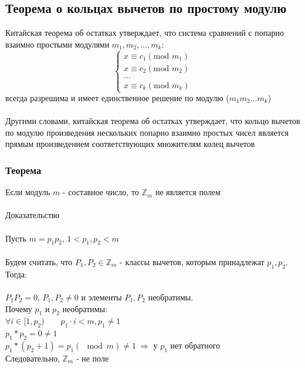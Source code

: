 \documentclass[12pt]{article}
\begin{document}
\subsection{Теорема о кольцах вычетов по простому модулю}

Китайская теорема об остатках утверждает, что система сравнений с попарно взаимно простыми модулями
$m_1, m_2, \dots, m_k$:\\
\begin{equation*}
    \begin{cases}
        x \equiv c_1  (\text{mod } m_1) \\
        x \equiv c_2 (\text{mod } m_2)  \\
        \dots                           \\
        x \equiv c_k (\text{mod } m_k)
    \end{cases}
\end{equation*}
всегда разрешима и имеет единственное решение по модулю ($m_1m_2\dots m_k$)\\
\\
Другими словами, китайская теорема об остатках утверждает, что кольцо вычетов по модулю произведения нескольких попарно взаимно простых чисел является прямым произведением соответствующих множителям колец вычетов

\subsubsection{Теорема}
Если модуль $m$ - составное число, то $\mathbb{Z}_m$ не является полем\\
\\
Доказательство\\
\\
Пусть \quad $m = p_1p_2$, \qquad $1 < p_1, p_2 < m$\\
\\
Будем считать, что $P_1, P_2 \in \mathbb{Z}_m$ - классы вычетов, которым принадлежат $p_1, p_2$. Тогда:\\
\\
\quad $P_1P_2 = 0$, \quad $P_1, P_2 \ne 0$ \quad и элементы $P_1, P_2$ необратимы.\\
Почему $p_1$ и $p_2$ необратимы:\\
$\forall i \in [1, p_2) \qquad p_1 \cdot i < m, p_1 \neq 1$ \\
$p_1 * p_2 = 0 \neq 1$\\
$p_1 * (p_2 + 1) = p_1 (\mod m) \neq 1\ \Rightarrow$ у $p_1$ нет обратного \\
Следовательно, $\mathbb{Z}_m$ - не поле
\end{document}
